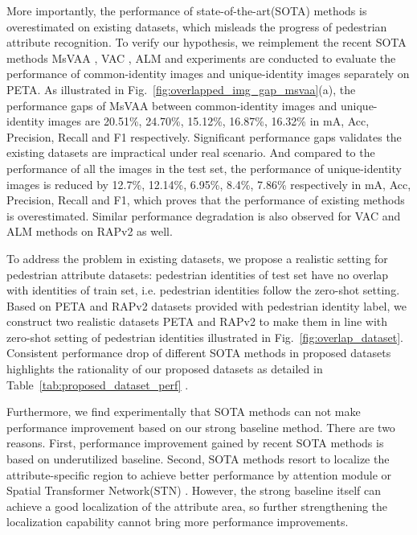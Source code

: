 \documentclass[runningheads]{llncs}
\begin{document}
More importantly, the performance of state-of-the-art(SOTA) methods is overestimated on existing datasets, which misleads the progress of pedestrian attribute recognition. To verify our hypothesis, we reimplement the recent SOTA methods MsVAA \cite{sarafianos2018deep}, VAC \cite{guo2019visual}, ALM \cite{tang2019Improving} and experiments are conducted to evaluate the performance of common-identity images and unique-identity images separately on PETA. As illustrated in Fig.~\ref{fig:overlapped_img_gap_msvaa}(a), the performance gaps of MsVAA between common-identity images and unique-identity images are 20.51\%, 24.70\%, 15.12\%, 16.87\%, 16.32\% in mA, Acc, Precision, Recall and F1 respectively. Significant performance gaps validates the existing datasets are impractical under real scenario. And compared to the performance of all the images in the test set, the performance of unique-identity images is reduced by 12.7\%, 12.14\%, 6.95\%, 8.4\%, 7.86\% respectively in mA, Acc, Precision, Recall and F1, which proves that the performance of existing methods is overestimated. Similar performance degradation is also observed for VAC and ALM methods on RAPv2 as well.

To address the problem in existing datasets, we propose a realistic  setting for pedestrian attribute datasets: pedestrian identities of test set have no overlap with identities of train set, i.e. pedestrian identities follow the zero-shot setting. Based on PETA \cite{deng2014pedestrian} and RAPv2 \cite{li2018richly} datasets provided with pedestrian identity label, we construct two realistic datasets PETA\textsubscript{} and RAPv2\textsubscript{} to make them in line with zero-shot setting of pedestrian identities illustrated in Fig.~\ref{fig:overlap_dataset}. Consistent performance drop of different SOTA methods in proposed datasets highlights the rationality of our proposed datasets as detailed in Table~\ref{tab:proposed_dataset_perf} .

Furthermore, we find experimentally that SOTA methods can not make performance improvement based on our strong baseline method. There are two reasons. First, performance improvement gained by recent SOTA methods is based on underutilized baseline. Second, SOTA methods resort to localize the attribute-specific region to achieve better performance by attention module \cite{sarafianos2018deep,guo2019visual} or Spatial Transformer Network(STN) \cite{tang2019Improving}. However, the strong baseline itself can achieve a good localization of the attribute area, so further strengthening the localization capability cannot bring more performance improvements.
\end{document}
